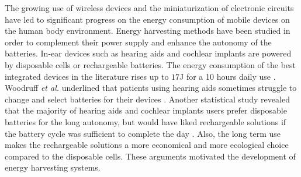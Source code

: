 \documentclass[3p,twocolumn,preprint]{elsarticle}
\begin{document}
The growing use of wireless devices and the miniaturization of electronic circuits have led to significant progress on the energy consumption of mobile devices on the human body environment. Energy harvesting methods have been studied in order to complement their power supply and enhance the autonomy of the batteries. In-ear devices such as hearing aids and cochlear implants are powered by disposable cells or rechargeable batteries. The energy consumption of the best integrated devices in the literature rises up to $17$J for a 10 hours daily use \cite{Scherer2019,Yip2015,Kulah2022}. Woodruff \emph{et al.} underlined that patients using hearing aids sometimes struggle to change and select batteries for their devices \cite{Woodruff2021}. Another statistical study revealed that the majority of hearing aids and cochlear implants users prefer disposable batteries for the long autonomy, but would have liked rechargeable solutions if the battery cycle was sufficient to complete the day \cite{PracticesAudiology2016}. Also, the long term use makes the rechargeable solutions a more economical and more ecological choice compared to the disposable cells. These arguments motivated the development of energy harvesting systems.
\end{document}
